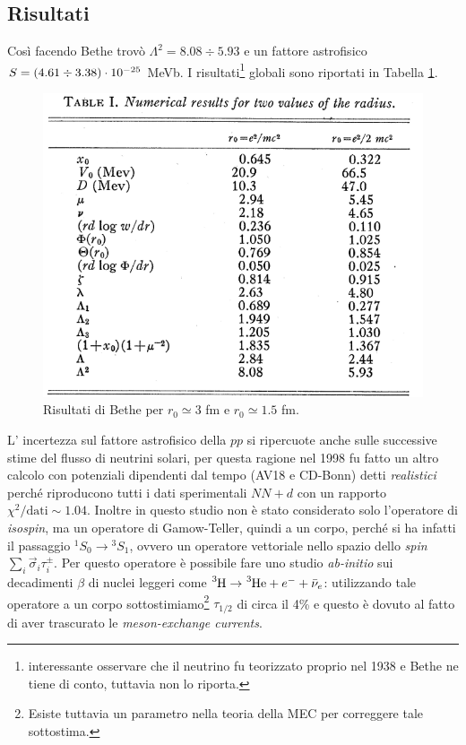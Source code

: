 \subsection{Risultati}
Così facendo Bethe trovò $\Lambda^2 = 8.08 \div 5.93$ e un fattore astrofisico $S = (4.61 \div 3.38)\cdot10^{-25}$ MeVb. I risultati\footnote{ interessante osservare che il neutrino fu teorizzato proprio nel 1938 e Bethe ne tiene di conto, tuttavia non lo riporta.} globali sono riportati in Tabella \ref{0331_tab}.
\begin{figure}[h]
    \centering
    \includegraphics*[scale=0.5]{Immagini/0331_Bethetab.png}
    \caption{Risultati di Bethe per $r_0 \simeq  3$ fm e $r_0 \simeq 1.5$ fm.}
    \label{0331_tab}
\end{figure}
\noindent L' incertezza sul fattore astrofisico della $pp$ si ripercuote anche sulle successive stime del flusso di neutrini solari, per questa ragione nel 1998 fu fatto un altro calcolo con potenziali dipendenti dal tempo (AV18 e CD-Bonn) detti \textit{realistici} perché riproducono tutti i dati sperimentali $NN + d$ con un rapporto $\chi^2/\text{dati}\sim 1.04$.
Inoltre in questo studio non è stato considerato solo l'operatore di \textit{isospin}, ma un operatore di Gamow-Teller, quindi a un corpo, perché si ha infatti il passaggio ${^1S_0} \to {^3S_1}$, ovvero un operatore vettoriale nello spazio dello \textit{spin} $\sum_i \vec{\sigma}_i \tau^\pm_i$. Per questo operatore è possibile fare uno studio \textit{ab-initio} sui decadimenti $\beta$ di nuclei leggeri come $\ce{^3H}\to\ce{^3He} +e^- + \bar{\nu}_e$: utilizzando tale operatore a un corpo sottostimiamo\footnote{Esiste tuttavia un parametro nella teoria della MEC per correggere tale sottostima.} $\tau_{1/2}$ di circa il 4\% e questo è dovuto al fatto di aver trascurato le \textit{meson-exchange currents}.
